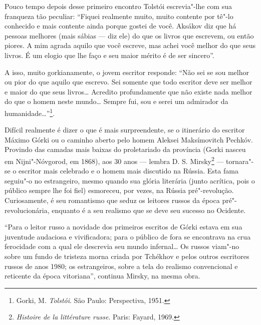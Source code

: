 Pouco tempo depois desse primeiro encontro Tolstói escrevia"-lhe com sua
franqueza tão peculiar: ``Fiquei realmente muito, muito contente por
tê"-lo conhecido e mais contente ainda porque gostei de você. Aksákov diz
que há pessoas melhores (mais sábias --- diz ele) do que os livros que
escrevem, ou então piores. A mim agrada aquilo que você escreve, mas
achei você melhor do que seus livros. É um elogio que lhe faço e seu
maior mérito é de ser sincero''.

A isso, muito gorkianamente, o jovem escritor responde: ``Não sei se sou
melhor ou pior do que aquilo que escrevo. Sei somente que todo escritor
deve ser melhor e maior do que seus livros\ldots{} Acredito profundamente que
não existe nada melhor do que o homem neste mundo\ldots{} Sempre fui, sou e
serei um admirador da humanidade\ldots{}''\footnote{Gorki, M. \emph{Tolstói}. São Paulo: Perspectiva, 1951.}.

Difícil realmente é dizer o que é mais surpreendente, se o itinerário do
escritor Máximo Górki ou o caminho aberto pelo homem Aleksei
Maksímovitch Pechkóv. Provindo das camadas mais baixas do proletariado
da província (Gorki nasceu em Nijni"-Nóvgorod, em 1868), aos 30 anos --- lembra
D. S. Mirsky\footnote{\emph{Histoire de la littérature russe}. Paris: Fayard, 1969.} --- tornara"-se o
escritor mais celebrado e o homem mais discutido na Rússia. Esta fama
seguiu"-o no estrangeiro, mesmo quando sua glória literária (junto
acrítica, pois o público sempre lhe foi fiel) esmoreceu, por vezes, na
Rússia pré"-revolução. Curiosamente, é seu romantismo que seduz os
leitores russos da época pré"-revolucionária, enquanto é a seu realismo
que se deve seu sucesso no Ocidente.

``Para o leitor russo a novidade dos primeiros escritos de Górki estava
em sua juventude audaciosa e vivificadora; para o público de fora se
encontrava na crua ferocidade com a qual ele descrevia seu mundo
infernal\ldots{} Os russos viam"-no sobre um fundo de tristeza morna criada
por Tchékhov e pelos outros escritores russos de anos 1980; os
estrangeiros, sobre a tela do realismo convencional e reticente da época
vitoriana'', continua Mirsky, na mesma obra.

